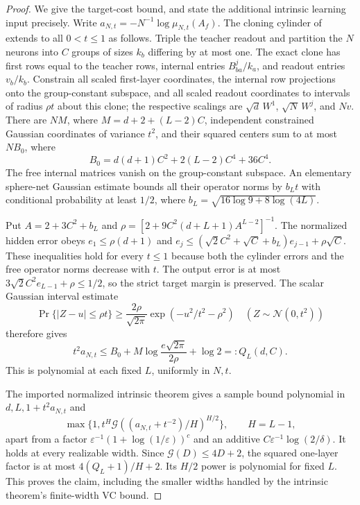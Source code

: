 \documentclass[11pt]{article}
\theoremstyle{remark}
\newcommand{\Gain}{\mathcal G}
\begin{document}
\begin{proof}
We give the target-cost bound, and state the additional intrinsic
learning input precisely. Write
$a_{N,t}= -N^{-1}\log\mu_{N,t}(A_f)$.
The cloning cylinder of \cite[Proposition \texttt{prop:cloning}]{meanfield}
extends to all $0<t\le1$ as follows.
Triple the teacher readout and partition the $N$ neurons into
$C$ groups of sizes $k_b$ differing by at most one.
The exact clone has first rows equal to the teacher rows,
internal entries $B^j_{ba}/k_a$, and readout entries $v_b/k_b$.
Constrain all scaled first-layer coordinates, the internal
row projections onto the group-constant subspace, and all
scaled readout coordinates to intervals of radius $\rho t$
about this clone; the respective scalings are
$\sqrt d\,W^1$, $\sqrt N\,W^j$, and $Nv$.
There are
$NM$, where $M=d+2+(L-2)C$, independent constrained Gaussian
coordinates of variance $t^2$, and their squared centers sum
to at most $NB_0$, where
\[
 B_0=d(d+1)C^2+2(L-2)C^4+36C^4.
\]
The free internal matrices vanish on the group-constant
subspace. An elementary sphere-net Gaussian estimate bounds
all their operator norms by $b_Lt$ with conditional
probability at least $1/2$, where
$b_L=\sqrt{16\log9+8\log(4L)}$.

Put $A=2+3C^2+b_L$ and
$\rho=[2+9C^2(d+L+1)A^{L-2}]^{-1}$.
The normalized hidden error obeys
$e_1\le\rho(d+1)$ and
$e_j\le(\sqrt2C^2+\sqrt C+b_L)e_{j-1}+\rho\sqrt C$.
These inequalities hold for every $t\le1$ because both
the cylinder errors and the free operator norms decrease
with $t$. The output error is at most
$3\sqrt2C^2e_{L-1}+\rho\le1/2$, so the strict target
margin is preserved. The scalar Gaussian interval estimate
\[
 \Pr\{|Z-u|\le\rho t\}
 \ge \frac{2\rho}{\sqrt{2\pi}}
             \exp(-u^2/t^2-\rho^2)
 \quad (Z\sim\mathcal N(0,t^2))
\]
therefore gives
\[
 t^2a_{N,t}
 \le B_0+M\log\frac{e\sqrt{2\pi}}{2\rho}+\log2
 =:Q_L(d,C).
\]
This is polynomial at each fixed $L$, uniformly in $N,t$.

The imported normalized intrinsic theorem
\cite[Proposition \texttt{prop:intrinsic}]{uniformtargets}
gives a sample bound polynomial in
$d,L,1+t^2a_{N,t}$ and
\[
 \max\{1,t^H\Gain((a_{N,t}+t^{-2})/H)^{H/2}\},
 \qquad H=L-1,
\]
apart from a factor
$\varepsilon^{-1}(1+\log(1/\varepsilon))^c$
and an additive $C\varepsilon^{-1}\log(2/\delta)$.
It holds at every realizable width. Since
$\Gain(D)\le4D+2$, the squared one-layer factor is at most
$4(Q_L+1)/H+2$. Its $H/2$ power is polynomial for fixed
$L$. This proves the claim, including the smaller widths
handled by the intrinsic theorem's finite-width VC bound.
\end{proof}
\end{document}

